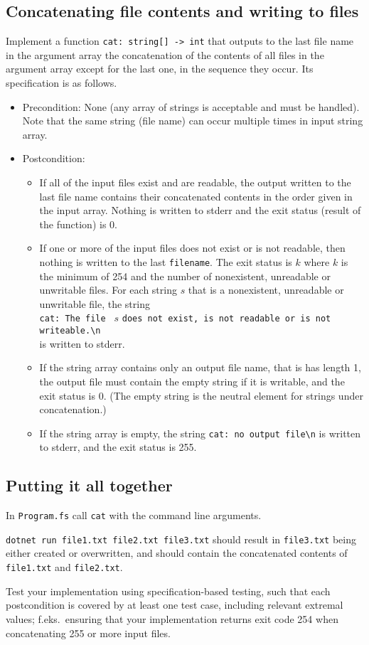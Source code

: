 \subsection*{Concatenating file contents and writing to files}

Implement a function \texttt{cat: string[] -> int} that outputs to the last file name in the argument array the concatenation of the contents of all files in the argument array except for the last one, in the sequence they occur. Its specification is as follows.
\begin{itemize}
\item Precondition: None (any array of strings is acceptable and must be handled).  Note that the same string (file name) can occur multiple times in input string array.
\item Postcondition: 
\begin{itemize}
\item If all of the input files exist and are readable, the output written to the last file name contains their concatenated contents in the order given in the input array. Nothing is written to stderr and the exit status (result of the function) is $0$.
\item If one or more of the input files does not exist or is not readable, then
  nothing is written to the last \texttt{filename}. The exit status is $k$ where $k$ is the minimum of 254 and the number of nonexistent, unreadable or unwritable files. For each string $s$ that is a nonexistent, unreadable or unwritable file, the string \\ \verb|cat: The file | $s$ \verb|does not exist, is not readable or is not writeable.\n| \\ is written to stderr.
\item If the string array contains only an output file name, that is has length 1, the output file must contain the empty string if it is writable, and the exit status is 0. (The empty string is the neutral element for strings under concatenation.)
  \item If the string array is empty, the string \verb|cat: no output file\n| is written to stderr, and the exit status is 255. 
\end{itemize}
\end{itemize} 

\subsection*{Putting it all together}

In \texttt{Program.fs} call \texttt{cat} with the command line arguments.

\texttt{dotnet run file1.txt file2.txt file3.txt} should result in \texttt{file3.txt} being either created or overwritten, and should contain the concatenated contents of \texttt{file1.txt} and \texttt{file2.txt}.

Test your implementation using specification-based testing, such that each postcondition is covered by at least one test case, including relevant extremal values; f.eks.~ensuring that your implementation
returns exit code 254 when concatenating 255 or more input files.  